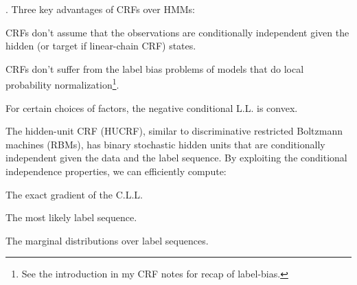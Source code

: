 \documentclass[11pt]{article}
\begin{document}
\p {}. Three key advantages of CRFs over HMMs:
\begin{compactenum}
	\item CRFs don't assume that the observations are conditionally independent given the hidden (or target if linear-chain CRF) states. 
	
	\item CRFs don't suffer from the label bias problems of models that do local probability normalization\footnote{See the introduction in my CRF notes for recap of label-bias.}. 
	
	\item For certain choices of factors, the negative conditional L.L. is convex. 
\end{compactenum}
The hidden-unit CRF (HUCRF), similar to discriminative restricted Boltzmann machines (RBMs), has binary stochastic hidden units that are conditionally independent given the data and the label sequence. By exploiting the conditional independence properties, we can efficiently compute:
\begin{compactenum}
	\item The exact gradient of the C.L.L. 
	
	\item The most likely label sequence. 
	
	\item The marginal distributions over label sequences. 
\end{compactenum}
\end{document}
